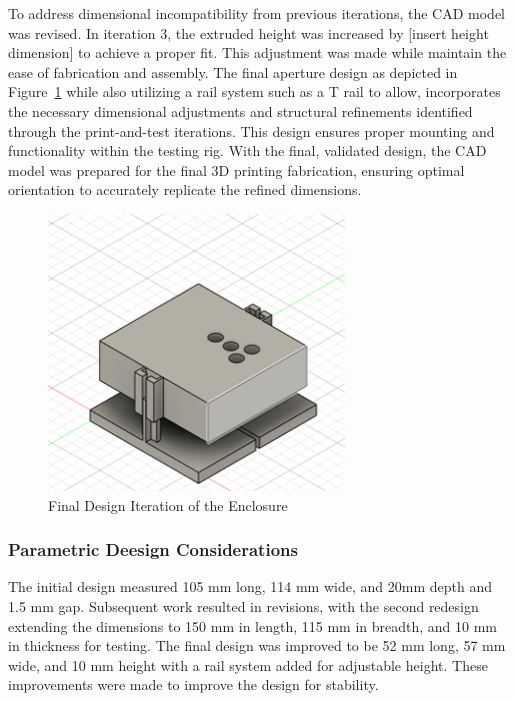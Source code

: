 To address dimensional incompatibility from previous iterations, the CAD model was revised. 
In iteration 3, the extruded height was increased by [insert height dimension] to achieve a proper fit. 
This adjustment was made while maintain the ease of fabrication and assembly.
The final aperture design as depicted in Figure~\ref{fig:CADFinal} while also utilizing a rail system such as a T rail to allow, incorporates the necessary dimensional adjustments and structural refinements identified through the print-and-test iterations. 
This design ensures proper mounting and functionality within the testing rig. 
With the final, validated design, the CAD model was prepared for the final 3D printing fabrication, ensuring optimal orientation to accurately replicate the refined dimensions.

\begin{figure}[htbp]
    \centering
    \includegraphics[width=0.7\textwidth]{figures/CAD-3DPrint/FinalCAD.png}
    \caption{Final Design Iteration of the Enclosure}
    \label{fig:CADFinal}
\end{figure}

\subsubsection{Parametric Deesign Considerations}
The initial design measured 105 mm long, 114 mm wide, and 20mm depth and 1.5 mm gap. 
Subsequent work resulted in revisions, with the second redesign extending the dimensions to 150 mm in length, 115 mm in breadth, and 10 mm in thickness for testing. 
The final design was improved to be 52 mm long, 57 mm wide, and 10 mm height with a rail system added for adjustable height. 
These improvements were made to improve the design for stability.

